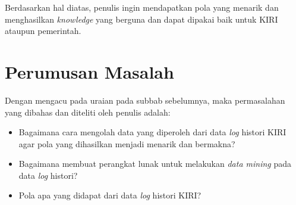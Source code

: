 Berdasarkan hal diatas, penulis ingin mendapatkan pola yang menarik dan menghasilkan \textsl{knowledge} yang berguna dan dapat dipakai baik untuk KIRI ataupun pemerintah.





\section{Perumusan Masalah}
Dengan mengacu pada uraian pada subbab sebelumnya, maka permasalahan yang dibahas dan diteliti oleh penulis adalah:
\begin{itemize}
	\item Bagaimana cara mengolah data yang diperoleh dari data \textsl{log} histori KIRI agar pola yang dihasilkan menjadi menarik dan bermakna?
	\item Bagaimana membuat perangkat lunak untuk melakukan \textsl{data mining} pada data \textsl{log} histori?
	\item Pola apa yang didapat dari data \textsl{log} histori KIRI?
\end{itemize}

